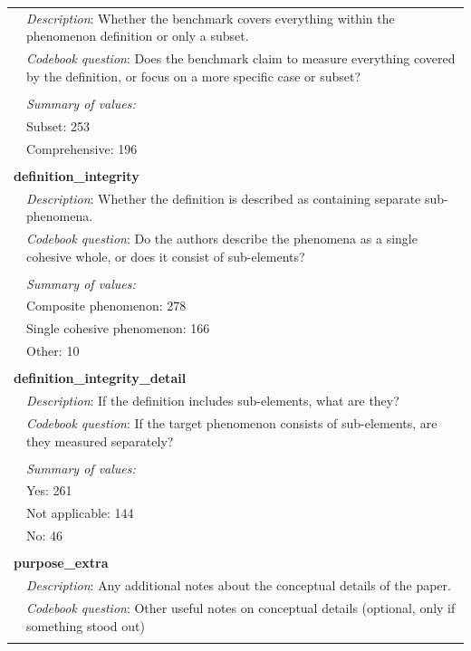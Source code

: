 {\begin{longtable}{p{}p{}}
& \textit{Description}: Whether the benchmark covers everything within the phenomenon definition or only a subset. \\
& \textit{Codebook question}: Does the benchmark claim to measure everything covered by the definition, or focus on a more specific case or subset? \\
\\
& \textit{Summary of values:} \\
& Subset: 253 \\
& Comprehensive: 196 \\
\\
\multicolumn{2}{l}{\textbf{definition\_integrity}} \\
& \textit{Description}: Whether the definition is described as containing separate sub-phenomena. \\
& \textit{Codebook question}: Do the authors describe the phenomena as a single cohesive whole, or does it consist of sub-elements? \\
\\
& \textit{Summary of values:} \\
& Composite phenomenon: 278 \\
& Single cohesive phenomenon: 166 \\
& Other: 10 \\
\\
\multicolumn{2}{l}{\textbf{definition\_integrity\_detail}} \\
& \textit{Description}: If the definition includes sub-elements, what are they? \\
& \textit{Codebook question}: If the target phenomenon consists of sub-elements, are they measured separately? \\
\\
& \textit{Summary of values:} \\
& Yes: 261 \\
& Not applicable: 144 \\
& No: 46 \\
\\
\multicolumn{2}{l}{\textbf{purpose\_extra}} \\
& \textit{Description}: Any additional notes about the conceptual details of the paper. \\
& \textit{Codebook question}: Other useful notes on conceptual details (optional, only if something stood out) \\
\\
\end{longtable}}

